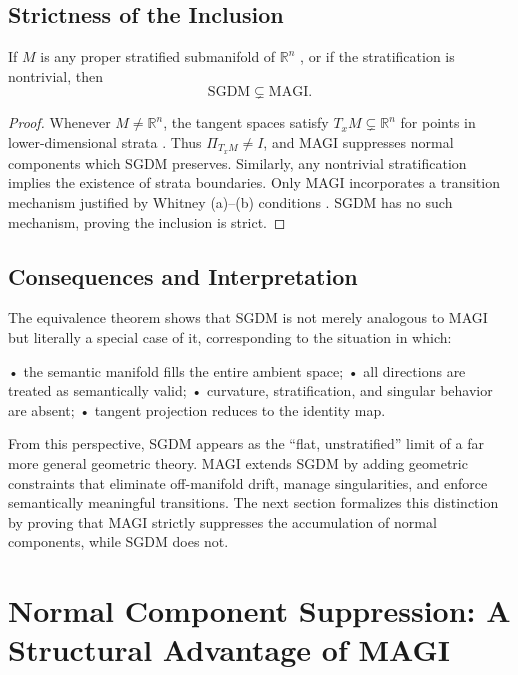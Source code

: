 \documentclass[12pt]{article}
\begin{document}
\subsection*{Strictness of the Inclusion}

\begin{corollary}
If $M$ is any proper stratified submanifold of $\mathbb{R}^n$ \citep{Whitney1965,Pflaum2000}, or if the stratification is nontrivial, then
\[
\mathrm{SGDM} \subsetneq \mathrm{MAGI}.
\]
\end{corollary}

\begin{proof}
Whenever $M \neq \mathbb{R}^n$, the tangent spaces satisfy $T_xM \subsetneq \mathbb{R}^n$ for points in lower-dimensional strata \citep{GuilleminPollack1974}. Thus $\Pi_{T_xM} \neq I$, and MAGI suppresses normal components which SGDM preserves. Similarly, any nontrivial stratification implies the existence of strata boundaries. Only MAGI incorporates a transition mechanism justified by Whitney (a)--(b) conditions \citep{Whitney1965,Mather1973}. SGDM has no such mechanism, proving the inclusion is strict.
\end{proof}

\subsection*{Consequences and Interpretation}

The equivalence theorem shows that SGDM is not merely analogous to MAGI but literally a special case of it, corresponding to the situation in which:

• the semantic manifold fills the entire ambient space;  
• all directions are treated as semantically valid;  
• curvature, stratification, and singular behavior are absent;  
• tangent projection reduces to the identity map.

From this perspective, SGDM appears as the “flat, unstratified” limit of a far more general geometric theory. MAGI extends SGDM by adding geometric constraints that eliminate off-manifold drift, manage singularities, and enforce semantically meaningful transitions. The next section formalizes this distinction by proving that MAGI strictly suppresses the accumulation of normal components, while SGDM does not.
\section{Normal Component Suppression: A Structural Advantage of MAGI}
\end{document}
